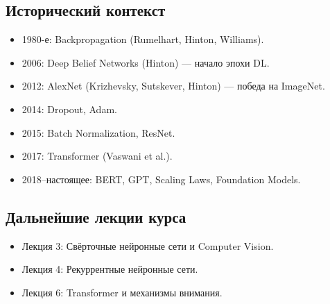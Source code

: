 \documentclass[a4paper,12pt]{article}
\begin{document}
\subsection{Исторический контекст}
\begin{itemize}
    \item 1980-е: Backpropagation (Rumelhart, Hinton, Williams).
    \item 2006: Deep Belief Networks (Hinton) — начало эпохи DL.
    \item 2012: AlexNet (Krizhevsky, Sutskever, Hinton) — победа на ImageNet.
    \item 2014: Dropout, Adam.
    \item 2015: Batch Normalization, ResNet.
    \item 2017: Transformer (Vaswani et al.).
    \item 2018--настоящее: BERT, GPT, Scaling Laws, Foundation Models.
\end{itemize}

\subsection{Дальнейшие лекции курса}
\begin{itemize}
    \item Лекция 3: Свёрточные нейронные сети и Computer Vision.
    \item Лекция 4: Рекуррентные нейронные сети.
    \item Лекция 6: Transformer и механизмы внимания.
\end{itemize}
\end{document}
